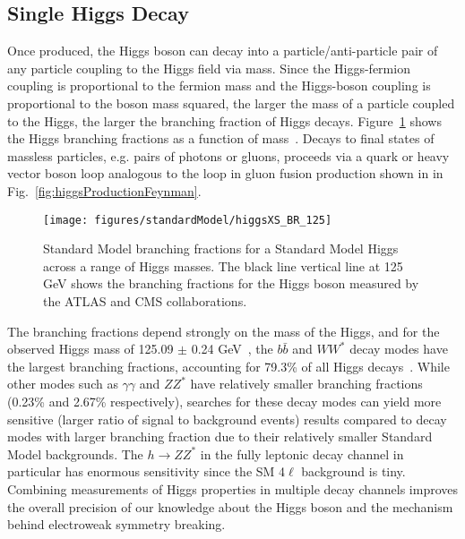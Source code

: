 \subsection{Single Higgs Decay}
\label{sec:higgsDecay}
Once produced, the Higgs boson can decay into a particle/anti-particle pair of any particle coupling to the Higgs field via mass. Since the Higgs-fermion coupling is proportional to the fermion mass and the Higgs-boson coupling is proportional to the boson mass squared, the larger the mass of a particle coupled to the Higgs, the larger the branching fraction of Higgs decays. Figure~\ref{fig:higgsBranchingFractions} shows the Higgs branching fractions as a function of mass~\cite{Dittmaier:2011ti}. Decays to final states of massless particles, e.g. pairs of photons or gluons, proceeds via a quark or heavy vector boson loop analogous to the loop in gluon fusion production shown in in Fig.~\ref{fig:higgsProductionFeynman}.

\begin{figure}[h!]
\centering
\texttt{[image: figures/standardModel/higgsXS\_BR\_125]}
\caption{Standard Model branching fractions for a Standard Model Higgs across a range of Higgs masses. The black line vertical line at 125 GeV shows the branching fractions for the Higgs boson measured by the ATLAS and CMS collaborations.}
\label{fig:higgsBranchingFractions}
\end{figure}

The branching fractions depend strongly on the mass of the Higgs, and for the observed Higgs mass of 125.09 $\pm$ 0.24 GeV~\cite{Aad:2015zhl}, the $b\bar{b}$ and $WW^*$ decay modes have the largest branching fractions, accounting for 79.3\% of all Higgs decays~\cite{Heinemeyer:2013tqa}. While other modes such as $\gamma\gamma$ and $ZZ^*$ have relatively smaller branching fractions (0.23\% and 2.67\% respectively), searches for these decay modes can yield more sensitive (larger ratio of signal to background events) results compared to decay modes with larger branching fraction due to their relatively smaller Standard Model backgrounds. The $h\rightarrow ZZ^*$ in the fully leptonic decay channel in particular has enormous sensitivity since the SM 4$\ell$ background is tiny. Combining measurements of Higgs properties in multiple decay channels improves the overall precision of our knowledge about the Higgs boson and the mechanism behind electroweak symmetry breaking.

